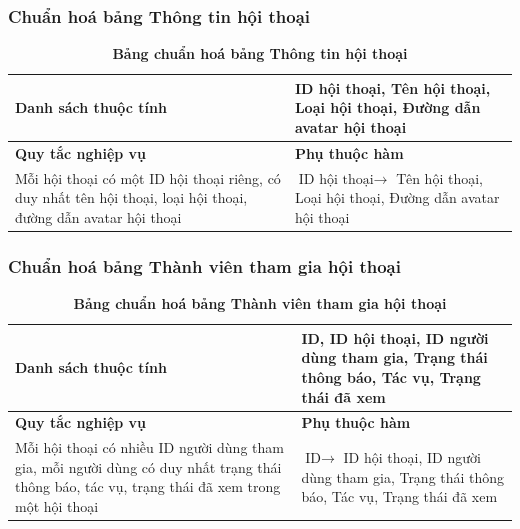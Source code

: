 \subsubsection{Chuẩn hoá bảng Thông tin hội thoại}
\mbox{}

\begin{table}[H]
  \caption{\bfseries \fontsize{12pt}{0pt}\selectfont Bảng chuẩn hoá bảng Thông tin hội thoại}
  \centering
  \begin{tabularx}{0.9\textwidth}{|X|X|}
    \hline
    \textbf{Danh sách thuộc tính} & ID hội thoại, Tên hội thoại, 
    Loại hội thoại, Đường dẫn avatar hội thoại \\
    \hline
    \textbf{Quy tắc nghiệp vụ} & \textbf{Phụ thuộc hàm} \\
    \hline
    Mỗi hội thoại có một ID hội thoại riêng, có duy nhất tên hội thoại, 
    loại hội thoại, đường dẫn avatar hội thoại
    & \parbox[t]{\linewidth}{$\text{ID hội thoại} \rightarrow$ Tên hội thoại, 
    Loại hội thoại, Đường dẫn avatar hội thoại} \\
    \hline
     \\
     \\
    \hline
  \end{tabularx}
\end{table}

\subsubsection{Chuẩn hoá bảng Thành viên tham gia hội thoại}
\mbox{}

\begin{table}[H]
  \caption{\bfseries \fontsize{12pt}{0pt}\selectfont Bảng chuẩn hoá bảng Thành viên tham gia hội thoại}
  \centering
  \begin{tabularx}{0.9\textwidth}{|X|X|}
    \hline
    \textbf{Danh sách thuộc tính} & ID, ID hội thoại, ID người dùng tham gia,
    Trạng thái thông báo, Tác vụ, Trạng thái đã xem \\
    \hline
    \textbf{Quy tắc nghiệp vụ} & \textbf{Phụ thuộc hàm} \\
    \hline
    Mỗi hội thoại có nhiều ID người dùng tham gia, mỗi người dùng có duy nhất trạng thái thông báo,
    tác vụ, trạng thái đã xem trong một hội thoại
    & \parbox[t]{\linewidth}{$\text{ID} \rightarrow$ ID hội thoại, ID người dùng tham gia,
    Trạng thái thông báo, Tác vụ, Trạng thái đã xem} \\
    \hline
     \\
     \\
    \hline
  \end{tabularx}
\end{table}

